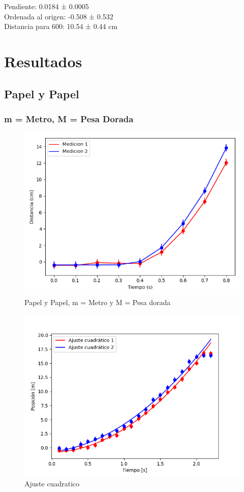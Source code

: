 \documentclass[12pt,a4]{article}
\begin{document}
Pendiente: 0.0184 ± 0.0005 \\

Ordenada al origen: -0.508 ± 0.532 \\

Distancia para 600: 10.54 ± 0.44 cm \\

\section{Resultados}

\subsection{Papel y Papel}

\subsubsection*{m = Metro, M = Pesa Dorada}

\begin{figure}[H]
    \centering
    \includegraphics[width=0.9\linewidth]{TiempoVsDistanciaPapelPapelM_O.png}
    \caption{Papel y Papel, m = Metro y M = Pesa dorada}
    \label{fig:PyPM_O}
\end{figure}

\begin{figure}[H]
    \centering
    \includegraphics[width=0.9\linewidth]{ajuste2_PapelPapelM_O.png}
    \caption{Ajuste cuadratico}
    \label{fig:a2PPM_O}
\end{figure}
\end{document}

